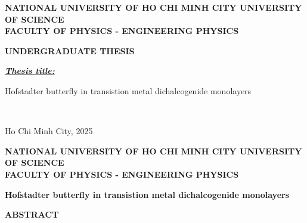 \documentclass{report}
\newcommand{\thesistitlee}{Hofstadter butterfly in transistion metal dichalcogenide monolayers}
\newcommand{\address}{NATIONAL UNIVERSITY OF HO CHI MINH CITY UNIVERSITY OF SCIENCE}
\newcommand{\department}{FACULTY OF PHYSICS - ENGINEERING PHYSICS}
\newcommand{\graddate}{Ho Chi Minh City, 2025}
\begin{document}
\begin{titlepage}
	\begin{center}
		{\bfseries

		{\large {\bf \address}}\\
		{{\textbf{\department}}}\\
		\vspace{2.5cm}

		{\large {\bf UNDERGRADUATE THESIS}}\\
		\vspace{3.0cm}

		}

	\end{center}
	\textit{\textbf{\underline{Thesis title:}}}\\
	\begin{center}
		{\bfseries

			{\largerrr\thesistitlee}
			\vspace{1in}

		}
	\end{center}
	\noindent
	\makebox[\textwidth]{\hfill\makebox[3in]{\hrulefill}}\\
	\begin{center}
	\end{center}
	\begin{center}
		\vspace{2.5in}
		{\graddate}
	\end{center}
\end{titlepage}

\newpage
{}
\pagestyle{fancy}
\renewcommand{\headrulewidth}{0pt}
\fancyhf{}
\fancyfoot[C]{\hspace{0cm} \thepage}
\setcounter{page}{1}
\begin{center}
	{\bfseries
		
		{\large {\bf \address}}\\
		{{\textbf{\department}}}\\
		\vspace{2.5cm}
		
		{\large{\bf \thesistitlee}}\\
		\vspace{3.0cm}
		
	}
	
\end{center}
\textbf{ABSTRACT}
\end{document}
